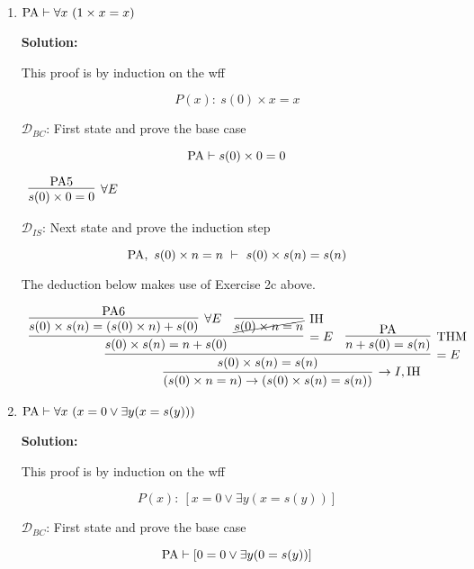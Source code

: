 \documentclass[11pt]{report}
\begin{document}
\begin{enumerate}
\begin{enumerate}
		\newpage
		\item $\text{PA} \vdash \forall x \ (1 \times x = x)$

		{\bf Solution:} 

		This proof is by induction on the wff 

		$$ P(x) : \ s(0) \times x = x$$

		$\mathcal{D}_{BC}$: First state and prove the base case 

		$$ \text{PA} \vdash s(0) \times 0 = 0$$

		\begin{mdframed}
			\begin{center}
				$\begin{array}{c}
					\infer[\forall E]{s(0)\times 0 = 0}
						{\PA 5}
				\end{array}$
			\end{center}
		\end{mdframed}

		$\mathcal{D}_{IS}$: Next state and prove the induction step

		$$ \PA, \ s(0)\times n = n \ \vdash \ s(0)\times s(n) = s(n)$$

		The deduction below makes use of Exercise 2c above. 

		\begin{mdframed}
			\begin{center}
				\footnotesize{$\begin{array}{c}
					\infer[\to I, \IH]{(s(0)\times n = n) \to (s(0)\times s(n) = s(n))}
						{\infer[=E]{s(0)\times s(n) = s(n)}
							{\infer[=E]{s(0)\times s(n) = n + s(0)}
								{\infer[\forall E]{s(0)\times s(n)= (s(0)\times n) + s(0)}{\PA 6}
								&
								\infer[\IH]{\cancel{s(0)\times n = n}}{}}
							&
							\infer[\THM]{n + s(0) = s(n)}{\PA}}}
				\end{array}$}
			\end{center}
		\end{mdframed}

		
		\newpage
		\item 
		
		$\text{PA} \vdash \forall x \ (x = 0 \lor \exists y (x = s(y)))$

		{\bf Solution:} 

		This proof is by induction on the wff 

		$$ P(x) : \ [x = 0 \lor \exists y (x = s(y))]$$

		$\mathcal{D}_{BC}$: First state and prove the base case 

		$$ \text{PA} \vdash [0 = 0 \lor \exists y (0 = s(y))]$$


\end{enumerate}
\end{enumerate}
\end{document}
